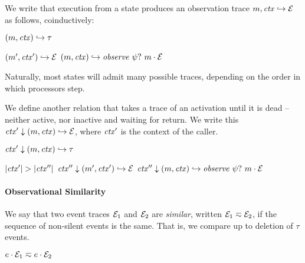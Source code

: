 \documentclass[10pt,conference]{ieeetran}%
\theoremstyle{definition}
\begin{document}
We write that execution from a state produces an observation trace \(m,\mathit{ctx} \hookrightarrow \mathcal{E}\)
as follows, coinductively:

         {\((m,\mathit{ctx}) \hookrightarrow \tau\)}

            {\((m',\mathit{ctx}') \hookrightarrow \mathcal{E}\)}
            {\((m,\mathit{ctx}) \hookrightarrow \mathit{observe} ~ \psi? ~ m \cdot \mathcal{E}\)}

Naturally, most states will admit many possible traces, depending on the order in which
processors step.

We define another relation that takes a trace of an activation until it is dead -- neither
active, nor inactive and waiting for return.
We write this \(\mathit{ctx}' \downarrow (m,\mathit{ctx}) \hookrightarrow \mathcal{E}\), where \(\mathit{ctx}'\)
is the context of the caller.

         {\(\mathit{ctx}' \downarrow (m,\mathit{ctx}) \hookrightarrow \tau\)}

                  {\(|\mathit{ctx}'| > |\mathit{ctx}''|\)}
                  {\(\mathit{ctx}'' \downarrow (m',\mathit{ctx}') \hookrightarrow \mathcal{E}\)}
                  {\(\mathit{ctx}'' \downarrow (m,\mathit{ctx}) \hookrightarrow \mathit{observe} ~ \psi? ~ m \cdot \mathcal{E}\)}

\paragraph*{Observational Similarity}

We say that two event traces $\mathcal{E}_1$ and $\mathcal{E}_2$ are {\em similar},
written \(\mathcal{E}_1 \eqsim \mathcal{E}_2\), if the sequence of non-silent events
is the same. That is, we compare up to deletion of \(\tau\) events.

\begin{minipage}{.4\columnwidth}
  \judgment{}{\(\obsT \eqsim \obsT\)}
\end{minipage}
\begin{minipage}{.4\columnwidth}
           {\(e \cdot \mathcal{E}_1 \eqsim e \cdot \mathcal{E}_2\)}
\end{minipage}
\end{document}
